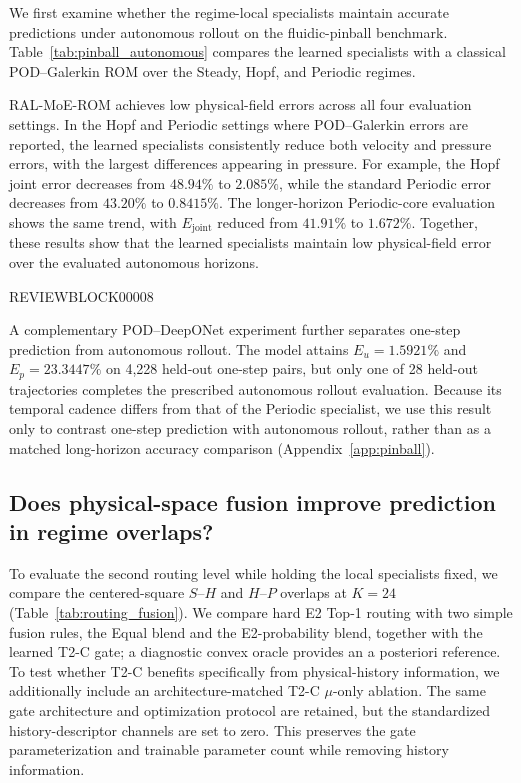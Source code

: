 \documentclass{article}
\begin{document}
We first examine whether the regime-local specialists maintain accurate predictions under autonomous rollout on the fluidic-pinball benchmark. Table~\ref{tab:pinball_autonomous} compares the learned specialists with a classical POD--Galerkin ROM over the Steady, Hopf, and Periodic regimes.

RAL-MoE-ROM achieves low physical-field errors across all four evaluation settings. In the Hopf and Periodic settings where POD--Galerkin errors are reported, the learned specialists consistently reduce both velocity and pressure
errors, with the largest differences appearing in pressure. For example, the Hopf joint error decreases from $48.94\%$ to $2.085\%$, while the standard Periodic error decreases from $43.20\%$ to $0.8415\%$. The longer-horizon Periodic-core evaluation shows the same trend, with $E_{\mathrm{joint}}$ reduced from $41.91\%$ to $1.672\%$. Together, these results show that the learned specialists maintain low physical-field error over the evaluated autonomous horizons.

\par


REVIEWBLOCK00008


\par

A complementary POD--DeepONet experiment further separates one-step prediction from autonomous rollout.
The model attains $E_u=1.5921\%$ and $E_p=23.3447\%$ on 4,228 held-out one-step pairs, but only one of 28 held-out trajectories completes the prescribed autonomous rollout evaluation. Because its temporal cadence differs from that of the Periodic specialist, we use this result only to contrast one-step prediction with autonomous rollout, rather than as a matched long-horizon accuracy comparison (Appendix~\ref{app:pinball}).





\subsection{Does physical-space fusion improve prediction in regime overlaps?}
To evaluate the second routing level while holding the local specialists fixed, we compare the centered-square $S$--$H$ and $H$--$P$ overlaps at $K=24$ (Table~\ref{tab:routing_fusion}). We compare hard E2 Top-1 routing with two simple fusion rules, the Equal blend and the E2-probability blend, together with the learned T2-C gate; a diagnostic convex oracle provides an a posteriori reference. To test whether T2-C benefits specifically from physical-history information, we additionally include an architecture-matched T2-C $\mu$-only ablation. The same gate architecture and optimization protocol are retained, but the standardized history-descriptor channels are set to zero. This preserves the gate parameterization and trainable parameter count while removing history information.
\end{document}
